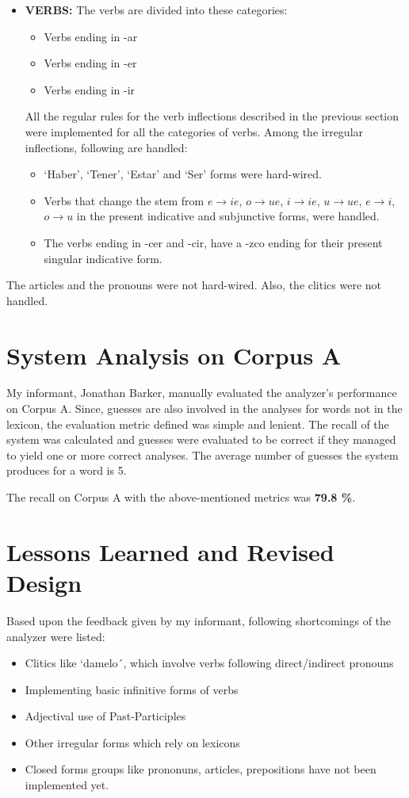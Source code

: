 \documentclass[11pt,letterpaper]{article}
\begin{document}
\begin{itemize}
\item
{\bf VERBS:} The verbs are divided into these categories:
\begin{itemize}
\item Verbs ending in -ar
\item Verbs ending in -er
\item Verbs ending in -ir
\end{itemize}
All the regular rules for the verb inflections described in the previous section were implemented for all the categories of verbs. Among the irregular inflections, following are handled:
\begin{itemize}
\item `Haber', `Tener', `Estar' and `Ser' forms were hard-wired.
\item Verbs that change the stem from $e \rightarrow ie$, $o \rightarrow ue$, $i \rightarrow ie$, $u \rightarrow ue$, $e \rightarrow i$, $o \rightarrow u$  in the present indicative and subjunctive forms, were handled. 
\item The verbs ending in -cer and -cir, have a -zco ending for their present singular indicative form.
\end{itemize}

\end{itemize}

The articles and the pronouns were not hard-wired. Also, the clitics were not handled.
\section{System Analysis on Corpus A}
My informant, Jonathan Barker, manually evaluated the analyzer's performance on Corpus A. Since, guesses are also involved in the analyses for words not in the lexicon, the evaluation metric defined was simple and lenient. The recall of the system was calculated and guesses were evaluated to be correct if they managed to yield one or more correct analyses. The average number of guesses the system produces for a word is 5.

\vspace{5mm}

The recall on Corpus A with the above-mentioned metrics was {\bf 79.8 \%}. 


\section{Lessons Learned and Revised Design}
Based upon the feedback given by my informant, following shortcomings of the analyzer were listed:
\begin{itemize}
\item Clitics like `damelo´, which involve verbs following direct/indirect pronouns  
\item Implementing basic infinitive forms of verbs
\item Adjectival use of Past-Participles 
\item Other irregular forms which rely on lexicons
\item Closed forms groups like prononuns, articles, prepositions have not been implemented yet.
\end{itemize}
\end{document}
